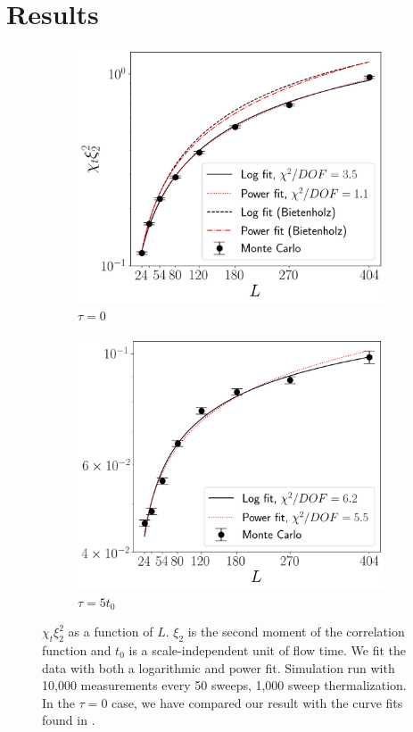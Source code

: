 \documentclass[a4paper,11pt]{article}
\begin{document}
\section{Results}
\begin{figure}[h!]
    \begin{center}
        \begin{subfigure}[b]{0.45\textwidth}
            \includegraphics[height=0.7\textwidth]{divergence.png}
            \caption{$\tau = 0$}
        \end{subfigure}%
        \begin{subfigure}[b]{0.45\textwidth}
            \centering
            \includegraphics[height=0.7\textwidth]{divergence_flowed.png}
            \caption{$\tau = 5t_0$}
        \end{subfigure}
    \end{center}
        \caption{\label{fig:divergence} $\chi_t\xi_2^2$ as a function of $L$. $\xi_2$ is the second moment of the correlation function and $t_0$ is a scale-independent unit of flow time. We fit the data with both a logarithmic and power fit. Simulation run with 10,000 measurements every 50 sweeps, 1,000 sweep thermalization. In the $\tau=0$ case, we have compared our result with the curve fits found in \cite{bietenholz2018}.}
\end{figure}
\end{document}
